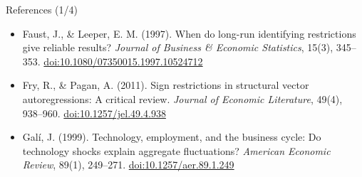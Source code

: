 \begin{frame}{References (1/4)}
\begin{itemize}
    \item Faust, J., \& Leeper, E. M. (1997). When do long-run identifying restrictions give reliable results? \textit{Journal of Business \& Economic Statistics}, 15(3), 345--353. \href{https://doi.org/10.1080/07350015.1997.10524712}{doi:10.1080/07350015.1997.10524712}
    \item Fry, R., \& Pagan, A. (2011). Sign restrictions in structural vector autoregressions: A critical review. \textit{Journal of Economic Literature}, 49(4), 938--960. \href{https://doi.org/10.1257/jel.49.4.938}{doi:10.1257/jel.49.4.938}
    \item Galí, J. (1999). Technology, employment, and the business cycle: Do technology shocks explain aggregate fluctuations? \textit{American Economic Review}, 89(1), 249--271. \href{https://doi.org/10.1257/aer.89.1.249}{doi:10.1257/aer.89.1.249}
\end{itemize}
\end{frame}


